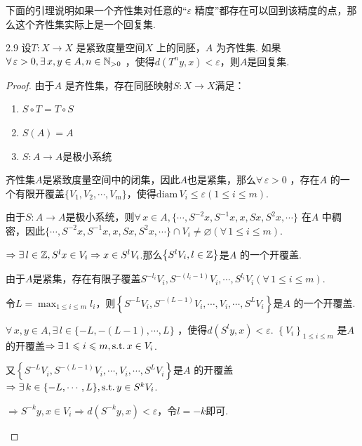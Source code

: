 下面的引理说明如果一个齐性集对任意的“$\varepsilon$ 精度”都存在可以回到该精度的点，那么这个齐性集实际上是一个回复集.\par
\begin{lemma}{}{2.9}
    设$T:X\to X$ 是紧致度量空间$X$ 上的同胚，$A$ 为齐性集. 如果$\forall\, \varepsilon>0,\exists\, x,y\in A,n\in\mathbb{N}_{>0}$ ，使得$d \left(T^ny,x\right)<\varepsilon$，则$A$是回复集.
\end{lemma}
\begin{proof}
    由于$A$ 是齐性集，存在同胚映射$S:X\to X$满足： \par
    \begin{enumerate}[(1)]
        \item $S\circ T=T\circ S$
        \item $S(A)=A$
        \item $S:A\to A$是极小系统
    \end{enumerate}\par
    齐性集$A$是紧致度量空间中的闭集，因此$A$也是紧集，那么$\forall\,\varepsilon>0$ ，存在$A$ 的一个有限开覆盖$\{V_1,V_2,\cdots,V_m\}$，使得$\mathrm{diam}\, V_i\leq\varepsilon(1\leq i\leq m)$.\par
    由于$S:A\to A$是极小系统，则$\forall\, x\in A,\{\cdots,S^{-2}x,S^{-1}x,x,Sx,S^2x,\cdots\}$ 在$A$ 中稠密，因此$\{\cdots,S^{-2}x,S^{-1}x,x,Sx,S^2x,\cdots\}\cap V_i\neq\varnothing(\forall\, 1\leq i\leq m)$.\par
    $\Rightarrow \exists\, l\in\mathbb{Z},S^lx\in V_i\Rightarrow x\in S^lV_i$.那么$\left\{S^lV_i,l\in\mathbb{Z}\right\}$是$A$ 的一个开覆盖.\par
    由于$A$是紧集，存在有限子覆盖$S^{-l_i}V_i,S^{-(l_i-1)}V_i,\cdots,S^{l_i}V_i(\forall\, 1\leq i\leq m)$.\par
    令$L=\max_{1\leq i\leq m}{l_i}$，则$\left\{S^{-L}V_i,S^{-(L-1)}V_i,\cdots,V_i,\cdots,S^{L}V_i\right\}$是$A$ 的一个开覆盖.\par
    \begin{claim}{$\forall\, x,y\in A,\exists\, l\in\{-L,-(L-1),\cdots,L\}$ ，使得$d\left(S^ly,x\right)<\varepsilon$.}
        $\left\{V_i\right\}_{1\leq i\leq m}$ 是$A$ 的开覆盖$\Rightarrow \exists\, 1\leqslant i\leqslant m,\operatorname{\text{s.t.}} x\in V_i$.\par
        又$\left\{S^{-L}V_i,S^{-(L-1)}V_i,\cdots,V_i,\cdots,S^{L}V_i\right\}$是$A$ 的开覆盖$\Rightarrow \exists\, k\in\{-L,\cdots,L\},\operatorname{\text{s.t.}} y\in S^{k}V_i$.\par
        $\Rightarrow S^{-k}y,x\in V_i\Rightarrow d \left(S^{-k}y,x\right)<\varepsilon$，令$l=-k$即可.
    \end{claim}\par

\end{proof}
